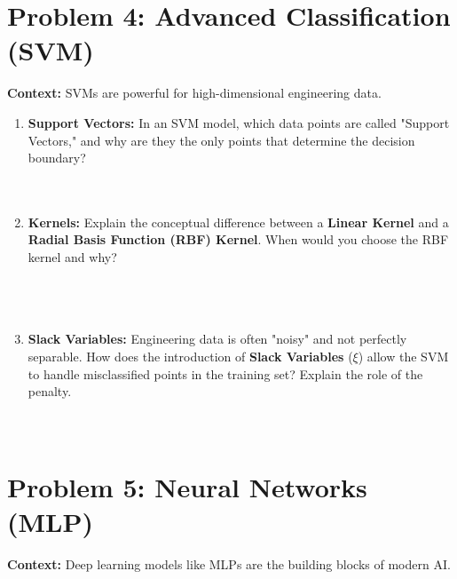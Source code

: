 \documentclass[12pt]{article}
\begin{document}
\section{Problem 4: Advanced Classification (SVM)}
\textbf{Context:} SVMs are powerful for high-dimensional engineering data.

\begin{enumerate}[label=(\alph*)]
    \item \textbf{Support Vectors:} In an SVM model, which data points are called "Support Vectors," and why are they the only points that determine the decision boundary? \\
    
    \fullunderline \\
    
    \fullunderline \\
    

    \item \textbf{Kernels:} Explain the conceptual difference between a \textbf{Linear Kernel} and a \textbf{Radial Basis Function (RBF) Kernel}. When would you choose the RBF kernel and why? \\
    
    \fullunderline \\
    
    \fullunderline \\
    
    \fullunderline \\

    \item \textbf{Slack Variables:} Engineering data is often "noisy" and not perfectly separable. How does the introduction of \textbf{Slack Variables} ($\xi$) allow the SVM to handle misclassified points in the training set? Explain the role of the penalty. \\
    \fullunderline \\
    
    \fullunderline \\
    
\end{enumerate}

\section{Problem 5: Neural Networks (MLP)}
\textbf{Context:} Deep learning models like MLPs are the building blocks of modern AI.
\end{document}
